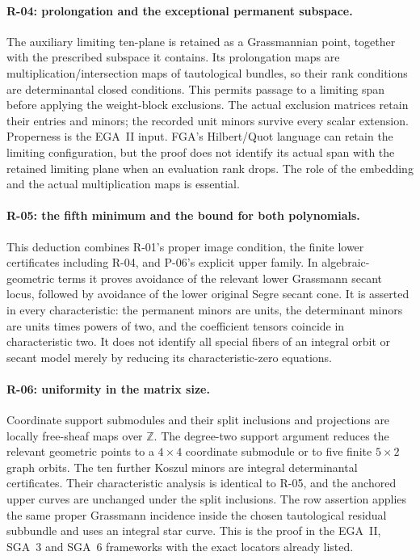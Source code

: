 \paragraph{R-04: prolongation and the exceptional permanent subspace.}
The auxiliary limiting ten-plane is retained as a
Grassmannian point, together with the prescribed
subspace it contains. Its prolongation maps are
multiplication/intersection maps of tautological
bundles, so their rank conditions are determinantal
closed conditions. This permits passage to a limiting
span before applying the weight-block exclusions.
The actual exclusion matrices retain their entries
and minors; the recorded unit minors survive every
scalar extension. Properness is the EGA~II input.
FGA's Hilbert/Quot language can retain the limiting
configuration, but the proof does not identify its
actual span with the retained limiting plane when
an evaluation rank drops. The role of the embedding
and the actual multiplication maps is essential.

\paragraph{R-05: the fifth minimum and the bound for both polynomials.}
This deduction combines R-01's proper image condition,
the finite lower certificates including R-04, and
P-06's explicit upper family. In algebraic-geometric
terms it proves avoidance of the relevant lower
Grassmann secant locus, followed by avoidance of the
lower original Segre secant cone. It is asserted in
every characteristic: the permanent minors are units,
the determinant minors are units times powers of two,
and the coefficient tensors coincide in characteristic
two. It does not identify all
special fibers of an integral orbit or secant model
merely by reducing its characteristic-zero equations.

\paragraph{R-06: uniformity in the matrix size.}
Coordinate support submodules and their split inclusions
and projections are locally free-sheaf maps over
$\mathbb Z$. The degree-two support argument reduces
the relevant geometric points to a $4\times4$ coordinate
submodule or to five finite $5\times2$ graph orbits.
The ten further Koszul minors are integral determinantal
certificates. Their characteristic analysis is identical
to R-05, and the anchored upper curves are unchanged
under the split inclusions. The row assertion applies
the same proper Grassmann incidence inside the chosen
tautological residual subbundle and uses an integral
star curve. This is the proof in the EGA~II, SGA~3 and
SGA~6 frameworks with the exact locators already listed.

